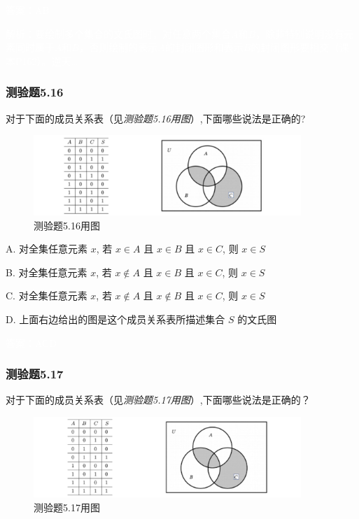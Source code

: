 \documentclass[UTF8, heading=true]{ctexart}
\begin{document}
\textcolor{white}{答案：AB}

\textcolor{white}{解析：要绘制多个集合的文氏图时，对任意两个集合$A$和$B$，除非特别说明没有元素同时属于$A$和$B$，否则绘制的表示$A$的封闭图形和表示$B$的封闭图形要相交（课本P162）。逆天\dots}




\subsubsection{测验题5.16}

对于下面的成员关系表（见\textit{测验题5.16用图}）,下面哪些说法是正确的?

\begin{figure}[H]
  \centering
  \includegraphics[width=0.9\textwidth]{5.16.jpg} %
  \caption{测验题5.16用图}
\end{figure}


A. 对全集任意元素 $x$, 若 $x \in A$ 且 $x \in B$ 且 $x \in C$, 则 $x \in S$

B. 对全集任意元素 $x$, 若 $x \notin A$ 且 $x \in B$ 且 $x \in C$, 则 $x \in S$

C. 对全集任意元素 $x$, 若 $x \notin A$ 且 $x \notin B$ 且 $x \in C$, 则 $x \in S$

D. 上面右边给出的图是这个成员关系表所描述集合 $S$ 的文氏图

\textcolor{white}{答案：ACD}

\subsubsection{测验题5.17}
对于下面的成员关系表（见\textit{测验题5.17用图}）,下面哪些说法是正确的？

\begin{figure}[H]
  \centering
  \includegraphics[width=0.9\textwidth]{5.17.jpg} %
  \caption{测验题5.17用图}
\end{figure}
\end{document}
